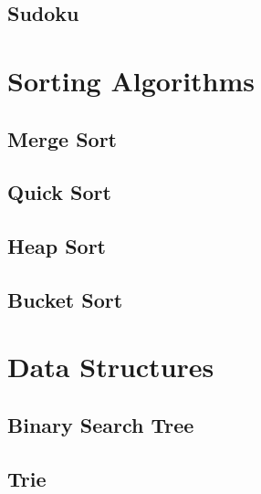 \documentclass[10pt,a4paper]{article}
\begin{document}
\begin{landscape}
\begin{multicols*}{2}


\subsection{Sudoku}



\section{Sorting Algorithms}

\subsection{Merge Sort}



\subsection{Quick Sort}



\subsection{Heap Sort}



\subsection{Bucket Sort}



\section{Data Structures}

\subsection{Binary Search Tree}



\subsection{Trie}


\end{multicols*}
\end{landscape}
\end{document}
